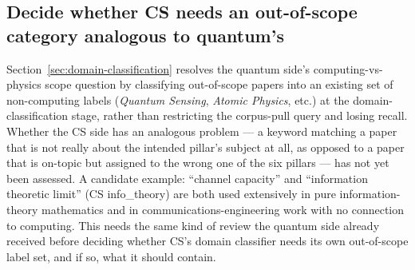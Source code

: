 \subsection{Decide whether CS needs an out-of-scope category analogous to quantum's}
\label{sec:planned-cs-out-of-scope}

Section~\ref{sec:domain-classification} resolves the quantum side's
computing-vs-physics scope question by classifying out-of-scope papers into an
existing set of non-computing labels (\emph{Quantum Sensing}, \emph{Atomic Physics},
etc.) at the domain-classification stage, rather than restricting the corpus-pull
query and losing recall. Whether the CS side has an analogous problem --- a keyword
matching a paper that is not really about the intended pillar's subject at all, as
opposed to a paper that is on-topic but assigned to the wrong one of the six pillars
--- has not yet been assessed. A candidate example: ``channel capacity'' and
``information theoretic limit'' (CS info\_theory) are both used extensively in pure
information-theory mathematics and in communications-engineering work with no
connection to computing. This needs the same kind of review the quantum side already
received before deciding whether CS's domain classifier needs its own out-of-scope
label set, and if so, what it should contain.
